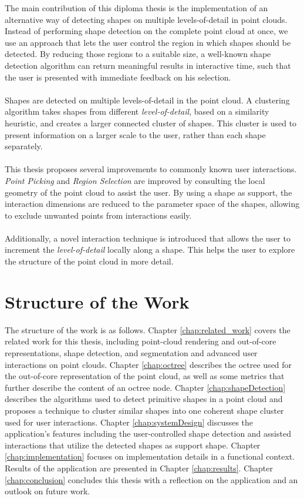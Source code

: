 The main contribution of this diploma thesis is the implementation of an alternative way of detecting shapes on multiple levels-of-detail in point clouds. Instead of performing shape detection on the complete point cloud at once, we use an approach that lets the user control the region in which shapes should be detected. By reducing those regions to a suitable size, a well-known shape detection algorithm can return meaningful results in interactive time, such that the user is presented with immediate feedback on his selection. 
\\
\\
Shapes are detected on multiple levels-of-detail in the point cloud. A clustering algorithm takes shapes from different \textit{level-of-detail}, based on a similarity heuristic, and creates a larger connected cluster of shapes. This cluster is used to present information on a larger scale to the user, rather than each shape separately. 
\\
\\ 
This thesis proposes several improvements to commonly known user interactions. \textit{Point Picking} and \textit{Region Selection} are improved by consulting the local geometry of the point cloud to assist the user. By using a shape as support, the interaction dimensions are reduced to the parameter space of the shapes, allowing to exclude unwanted points from interactions easily. 
\\
\\
Additionally,  a novel interaction technique is introduced that allows the user to increment the \textit{level-of-detail} locally along a shape. This helps the user to explore the structure of the point cloud in more detail. 


\section{Structure of the Work}

The structure of the work is as follows. Chapter \ref{chap:related_work} covers the related work for this thesis, including point-cloud rendering and out-of-core representations, shape detection, and segmentation and advanced user interactions on point clouds. Chapter \ref{chap:octree} describes the octree used for the out-of-core representation of the point cloud, as well as some metrics that further describe the content of an octree node. Chapter \ref{chap:shapeDetection} describes the algorithms used to detect primitive shapes in a point cloud and proposes a technique to cluster similar shapes into one coherent shape cluster used for user interactions. Chapter \ref{chap:systemDesign} discusses the application's features including the user-controlled shape detection and assisted interactions that utilize the detected shapes as support shape. Chapter \ref{chap:implementation} focuses on implementation details in a functional context. Results of the application are presented in Chapter \ref{chap:results}. Chapter \ref{chap:conclusion} concludes this thesis with a reflection on the application and an outlook on future work. 
